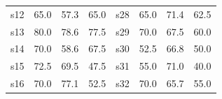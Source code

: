\begin{table}[H]
\begin{tabular}{cccc|cccc}
    s12 & \cellcolor{acchi}65.0 & \cellcolor{accmid}57.3 & \cellcolor{acchi}65.0 & s28 & \cellcolor{acchi}65.0 & \cellcolor{acchi}71.4 & \cellcolor{acchi}62.5 \\
    s13 & \cellcolor{acchi}80.0 & \cellcolor{acchi}78.6 & \cellcolor{acchi}77.5 & s29 & \cellcolor{acchi}70.0 & \cellcolor{acchi}67.5 & \cellcolor{acchi}60.0 \\
    s14 & \cellcolor{acchi}70.0 & \cellcolor{accmid}58.6 & \cellcolor{acchi}67.5 & s30 & \cellcolor{accmid}52.5 & \cellcolor{acchi}66.8 & \cellcolor{accmid}50.0 \\
    s15 & \cellcolor{acchi}72.5 & \cellcolor{acchi}69.5 & \cellcolor{acclo}47.5 & s31 & \cellcolor{accmid}55.0 & \cellcolor{acchi}71.0 & \cellcolor{acclo}40.0 \\
    s16 & \cellcolor{acchi}70.0 & \cellcolor{acchi}77.1 & \cellcolor{accmid}52.5 & s32 & \cellcolor{acchi}70.0 & \cellcolor{acchi}65.7 & \cellcolor{accmid}55.0 \\
    \bottomrule
  \end{tabular}
\end{table}
